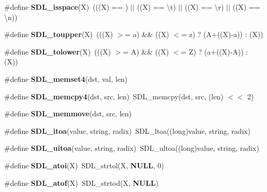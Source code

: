 \begin{DoxyCompactItemize}
\item 
\#define {\bfseries S\+D\+L\+\_\+isspace}(X)~(((X) == \textquotesingle{} \textquotesingle{}) $\vert$$\vert$ ((X) == \textquotesingle{}\textbackslash{}t\textquotesingle{}) $\vert$$\vert$ ((X) == \textquotesingle{}\textbackslash{}r\textquotesingle{}) $\vert$$\vert$ ((X) == \textquotesingle{}\textbackslash{}n\textquotesingle{}))\label{_s_d_l__stdinc_8h_aea90c573db7b50355f25355fa017a580}

\item 
\#define {\bfseries S\+D\+L\+\_\+toupper}(X)~(((X) $>$= \textquotesingle{}a\textquotesingle{}) \&\& ((X) $<$= \textquotesingle{}z\textquotesingle{}) ? (\textquotesingle{}A\textquotesingle{}+((X)-\/\textquotesingle{}a\textquotesingle{})) \+: (X))\label{_s_d_l__stdinc_8h_a96a014e239602e28e6f60e55d1b4575c}

\item 
\#define {\bfseries S\+D\+L\+\_\+tolower}(X)~(((X) $>$= \textquotesingle{}A\textquotesingle{}) \&\& ((X) $<$= \textquotesingle{}Z\textquotesingle{}) ? (\textquotesingle{}a\textquotesingle{}+((X)-\/\textquotesingle{}A\textquotesingle{})) \+: (X))\label{_s_d_l__stdinc_8h_a699ba624e92f37cca06fe4e3d2585a9a}

\item 
\#define {\bfseries S\+D\+L\+\_\+memset4}(dst,  val,  len)
\item 
\#define {\bfseries S\+D\+L\+\_\+memcpy4}(dst,  src,  len)~S\+D\+L\+\_\+memcpy(dst, src, (len) $<$$<$ 2)\label{_s_d_l__stdinc_8h_a2e2865567a13077bfe2064d6e3676882}

\item 
\#define {\bfseries S\+D\+L\+\_\+memmove}(dst,  src,  len)
\item 
\#define {\bfseries S\+D\+L\+\_\+itoa}(value,  string,  radix)~S\+D\+L\+\_\+ltoa((long)value, string, radix)\label{_s_d_l__stdinc_8h_a4d3cec8968ce9507b75c9bd52b19c5d2}

\item 
\#define {\bfseries S\+D\+L\+\_\+uitoa}(value,  string,  radix)~S\+D\+L\+\_\+ultoa((long)value, string, radix)\label{_s_d_l__stdinc_8h_ab3883d5bd0c48bf216b8b141efb01652}

\item 
\#define {\bfseries S\+D\+L\+\_\+atoi}(X)~S\+D\+L\+\_\+strtol(X, {\bf N\+U\+L\+L}, 0)\label{_s_d_l__stdinc_8h_a3a45553689babd8457e452ea29a9b79b}

\item 
\#define {\bfseries S\+D\+L\+\_\+atof}(X)~S\+D\+L\+\_\+strtod(X, {\bf N\+U\+L\+L})\label{_s_d_l__stdinc_8h_ad066e3362eba7fe2c11fdefc18d06c7f}


\end{DoxyCompactItemize}
